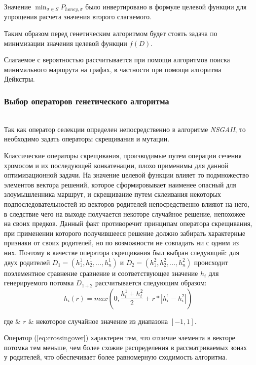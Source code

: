 Значение $\min_{\sigma \in S} P_{honey, \sigma}$ было инвертировано в формуле целевой функции для упрощения расчета значения второго слагаемого.

Таким образом перед генетическим алгоритмом будет стоять задача по минимизации значения целевой функции $f(D)$.

Слагаемое с вероятностью рассчитывается при помощи алгоритмов поиска минимального маршрута на графах, в частности при помощи алгоритма Дейкстры.

\subsubsection{Выбор операторов генетического алгоритма}\hspace*{\fill} \\

Так как оператор селекции определен непосредственно в алгоритме \textit{NSGAII}, то необходимо задать операторы скрещивания и мутации.

Классические операторы скрещивания, производимые путем операции сечения хромосом и их последующей конкатенации, плохо применимы для данной оптимизационной задачи. На значение целевой функции влияет то подмножество элементов вектора решений, которое сформировывает наименее опасный для злоумышленника маршрут, и скрещивание путем склеивания некоторых подпоследовательностей из векторов родителей непосредственно влияют на него, в следствие чего на выходе получается некоторе случайное решение, непохожее на своих предков. Данный факт противоречит принципам оператора скрещивания, при применении которого получившееся решение должно забирать характерные признаки от своих родителей, но по возможности не совпадать ни с одним из них. Поэтому в качестве оператора скрещивания был выбран следующий: для двух родителей $D_1 = (h_1^1, h_2^1, ..., h_n^1)$ и $D_2 = (h_1^2, h_2^2, ..., h_n^2)$ происходит поэлементное сравнение сравнение и соответствующее значение $h_i$ для генерируемого потомка $D_{1+2}$ рассчитывается следующим образом:
\begin{equation}
\label{eq:crossingover}
h_i(r) = max(0, \frac{h_i^1 + h_i^2}{2} + r * |h_i^1 - h_i^2|)
\end{equation}
\begin{explanation}
где & $r$ & некоторое случайное значение из диапазона $[-1,1]$.
\end{explanation}

Оператор (\ref{eq:crossingover}) характерен тем, что отличие элемента в векторе потомка тем меньше, чем более схожие распределения в рассматриваемых зонах у родителей, что обеспечивает более равномерную сходимость алгоритма.

